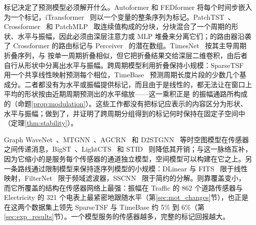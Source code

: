 {
标记决定了预测模型必须解开什么。Autoformer 和 FEDformer 将每个时间步嵌入为一个标记，iTransformer~\citep{liu2023itransformer} 则以一个变量的整条序列为标记。PatchTST~\citep{nie2023patchtst}、Crossformer~\citep{zhang2023crossformer} 和 PatchMLP~\citep{tang2025patchmlp} 取连续值构成的分块，分块混合了一个周期的形状、水平与振幅，因此必须由深层注意力或 MLP 堆叠来分离它们；\sysplus 的路由器沿袭了 Crossformer 的路由标记与 Perceiver~\citep{jaegle2021perceiver} 的潜在数组。TimesNet~\citep{wu2023timesnet} 按其主导周期折叠序列，与 \sysplus 按单一周期折叠相似，但它把折叠结果交给深层二维卷积，由后者自行从形状中分离出水平与振幅。跨周期模型利用折叠保持小规模：SparseTSF~\citep{lin2024sparsetsf} 用一个共享线性映射预测每个相位，TimeBase~\citep{huang2025timebase} 预测周期长度片段的少数几个基成分。二者都没有为水平或振幅提供标记，而且由于是线性的，都无法让在窗口上平均的形状按由近期周期预测出的水平缩放——这一乘积正是 \sysplus 的振幅通路所构成的（命题\ref{prop:modulation}）。这些工作都没有把标记应表示的内容区分为形状、水平与振幅；\sysplus 做到了，并证明了跨周期分组得到的标记何时保持在固定子空间中（定理\ref{thm:stability}）。

Graph WaveNet~\citep{wu2019graphwavenet}、MTGNN~\citep{wu2020mtgnn}、AGCRN~\citep{bai2020agcrn} 和 D2STGNN~\citep{shao2022decoupled} 等时空图模型在传感器之间传递消息，BigST~\citep{han2024bigst}、LightCTS~\citep{lai2023lightcts} 和 STID~\citep{shao2022stid} 则降低其开销；\sysplus 与这一脉络互补，因为它缩小的是服务每个传感器的通道独立模型，空间模型可以构建在它之上。另一条路线通过限制模型来保持逐序列模型的小规模：DLinear 与 FITS~\citep{fits2024} 限于线性映射，FilterNet~\citep{filternet2024} 限于频域滤波器，SSCNN~\citep{deng2024parsimony} 限于简约的分解。\sysplus 则靠覆盖变小，而它所覆盖的结构在传感器网络上最强：振幅在 Traffic 的 862 个道路传感器与 Electricity 的 321 个电表上最紧密地跟随水平（第\ref{sec:mot_changes}节），\sysplus 也正是在这两个数据集上领先 SparseTSF 与 TimeBase 约 5\% 到 6\%（第\ref{sec:exp_results}节）。一个模型服务的传感器越多，完整的标记回报越大。
}
